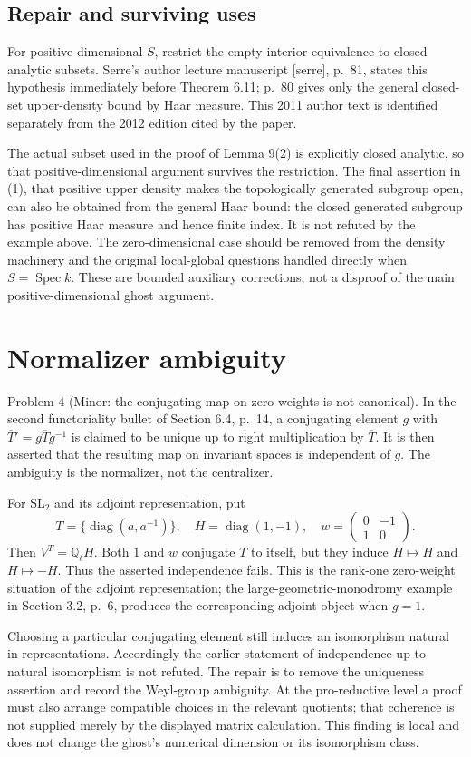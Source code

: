 \documentclass[10pt]{article}
\begin{document}
\subsection*{Repair and surviving uses}
For positive-dimensional \(S\), restrict the empty-interior equivalence to closed analytic subsets. Serre’s author lecture manuscript [serre], p. 81, states this hypothesis immediately before Theorem 6.11; p. 80 gives only the general closed-set upper-density bound by Haar measure. This 2011 author text is identified separately from the 2012 edition cited by the paper.\par
The actual subset used in the proof of Lemma 9(2) is explicitly closed analytic, so that positive-dimensional argument survives the restriction. The final assertion in (1), that positive upper density makes the topologically generated subgroup open, can also be obtained from the general Haar bound: the closed generated subgroup has positive Haar measure and hence finite index. It is not refuted by the example above. The zero-dimensional case should be removed from the density machinery and the original local-global questions handled directly when \(S=\operatorname{Spec}k\). These are bounded auxiliary corrections, not a disproof of the main positive-dimensional ghost argument.\par
\section*{Normalizer ambiguity}
Problem 4 (Minor: the conjugating map on zero weights is not canonical).  In the second functoriality bullet of Section 6.4, p. 14, a conjugating element \(g\) with \(\overline T'=g\overline T g^{-1}\) is claimed to be unique up to right multiplication by \(\overline T\). It is then asserted that the resulting map on invariant spaces is independent of \(g\). The ambiguity is the normalizer, not the centralizer.\par
For \(\mathrm{SL}_2\) and its adjoint representation, put \[T=\{\operatorname{diag}(a,a^{-1})\},\quad
 H=\operatorname{diag}(1,-1),\quad
 w=\begin{pmatrix}0&-1\\1&0\end{pmatrix}.\] Then \(V^T=\mathbb Q_\ell H\). Both \(1\) and \(w\) conjugate \(T\) to itself, but they induce \(H\mapsto H\) and \(H\mapsto-H\). Thus the asserted independence fails. This is the rank-one zero-weight situation of the adjoint representation; the large-geometric-monodromy example in Section 3.2, p. 6, produces the corresponding adjoint object when \(g=1\).\par
Choosing a particular conjugating element still induces an isomorphism natural in representations. Accordingly the earlier statement of independence up to natural isomorphism is not refuted. The repair is to remove the uniqueness assertion and record the Weyl-group ambiguity. At the pro-reductive level a proof must also arrange compatible choices in the relevant quotients; that coherence is not supplied merely by the displayed matrix calculation. This finding is local and does not change the ghost’s numerical dimension or its isomorphism class.\par
\end{document}
